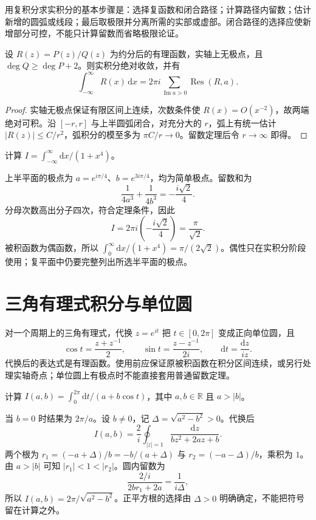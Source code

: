 用复积分求实积分的基本步骤是：选择复函数和闭合路径；计算路径内留数；估计新增的圆弧或线段；最后取极限并分离所需的实部或虚部。闭合路径的选择应使新增部分可控，不能只计算留数而省略极限论证。

\begin{theorem}[有理函数的上半平面公式]
\label{thm:ca-rational-real}
设 $R(z)=P(z)/Q(z)$ 为约分后的有理函数，实轴上无极点，且 $\deg Q\ge\deg P+2$。则实积分绝对收敛，并有
\[
 \int_{-\infty}^{\infty}R(x)\,\mathrm dx
 =2\pi i\sum_{\operatorname{Im}a>0}\operatorname{Res}(R,a).
\]
\end{theorem}
\begin{proof}
实轴无极点保证有限区间上连续，次数条件使 $R(x)=O(x^{-2})$，故两端绝对可积。沿 $[-r,r]$ 与上半圆弧闭合，对充分大的 $r$，弧上有统一估计 $|R(z)|\le C/r^2$，弧积分的模至多为 $\pi C/r\to0$。留数定理后令 $r\to\infty$ 即得。
\end{proof}

\begin{example}[一个四次分母的积分]
\label{ex:ca-quartic-integral}
计算 $I=\int_{-\infty}^{\infty}\mathrm dx/(1+x^4)$。
\end{example}
\begin{solve}
上半平面的极点为 $a=e^{i\pi/4}$、$b=e^{3i\pi/4}$，均为简单极点。留数和为
\[
 \frac1{4a^3}+\frac1{4b^3}=-\frac{i\sqrt2}{4}.
\]
分母次数高出分子四次，符合定理条件，因此
\[
 I=2\pi i\left(-\frac{i\sqrt2}{4}\right)=\frac\pi{\sqrt2}.
\]
被积函数为偶函数，所以 $\int_0^\infty\mathrm dx/(1+x^4)=\pi/(2\sqrt2)$。偶性只在实积分阶段使用；复平面中仍要完整列出所选半平面的极点。
\end{solve}

\section{三角有理式积分与单位圆}

对一个周期上的三角有理式，代换 $z=e^{it}$ 把 $t\in[0,2\pi]$ 变成正向单位圆，且
\begin{equation}
 \cos t=\frac{z+z^{-1}}2,\qquad
 \sin t=\frac{z-z^{-1}}{2i},\qquad
 \mathrm dt=\frac{\mathrm dz}{iz}.
 \label{eq:ca-trig-substitution}
\end{equation}
代换后的表达式是有理函数。使用前应保证原被积函数在积分区间连续，或另行处理实轴奇点；单位圆上有极点时不能直接套用普通留数定理。

\begin{example}[参数积分]
计算 $I(a,b)=\int_0^{2\pi}\mathrm dt/(a+b\cos t)$，其中 $a,b\in\mathbb R$ 且 $a>|b|$。
\end{example}
\begin{solve}
当 $b=0$ 时结果为 $2\pi/a$。设 $b\ne0$，记 $\Delta=\sqrt{a^2-b^2}>0$。代换后
\[
 I(a,b)=\frac2i\oint_{|z|=1}\frac{\mathrm dz}{bz^2+2az+b}.
\]
两个根为 $r_1=(-a+\Delta)/b=-b/(a+\Delta)$ 与 $r_2=(-a-\Delta)/b$，乘积为 $1$。由 $a>|b|$ 可知 $|r_1|<1<|r_2|$。圆内留数为
\[
 \frac{2/i}{2br_1+2a}=\frac1{i\Delta},
\]
所以 $I(a,b)=2\pi/\sqrt{a^2-b^2}$。正平方根的选择由 $\Delta>0$ 明确确定，不能把符号留在计算之外。
\end{solve}

